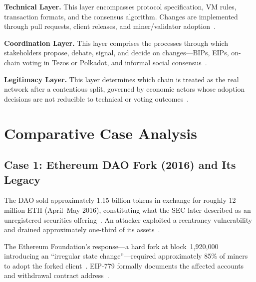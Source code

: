 \documentclass[sigconf,nonacm]{acmart}
\begin{document}
\textbf{Technical Layer.} This layer encompasses protocol specification, VM rules,
transaction formats, and the consensus algorithm. Changes are implemented through pull
requests, client releases, and miner/validator adoption~\cite{bitcoin-bips,ethereum-eip1}.

\textbf{Coordination Layer.} This layer comprises the processes through which
stakeholders propose, debate, signal, and decide on changes---BIPs, EIPs, on-chain voting
in Tezos or Polkadot, and informal social consensus~\cite{bip2,eip1,tezos-governance,
polkadot-runtimeupgrades}.

\textbf{Legitimacy Layer.} This layer determines which chain is treated as the real
network after a contentious split, governed by economic actors whose adoption decisions
are not reducible to technical or voting outcomes~\cite{walch2019code,sec2017dao}.

\section{Comparative Case Analysis}
\label{sec:cases}

\subsection{Case 1: Ethereum DAO Fork (2016) and Its Legacy}
\label{sec:dao}

The DAO sold approximately 1.15 billion tokens in exchange for roughly 12 million ETH
(April--May 2016), constituting what the SEC later described as an unregistered
securities offering~\cite{sec2017dao}. An attacker exploited a reentrancy vulnerability
and drained approximately one-third of its assets~\cite{atzei2017survey,sec2017dao}.

The Ethereum Foundation's response---a hard fork at block~1,920,000 introducing an
``irregular state change''---required approximately 85\% of miners to adopt the forked
client~\cite{eth-hardfork2016}. EIP-779 formally documents the affected accounts and
withdrawal contract address~\cite{eip779}.
\end{document}
